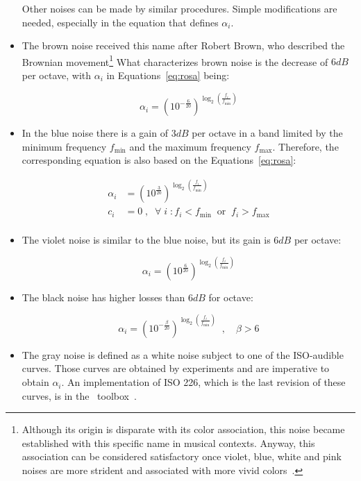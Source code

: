 \begin{itemize}
Other noises can be made by similar procedures. Simple modifications are needed, especially in the equation that defines $\alpha_i$.

  \item The brown noise received this name after Robert Brown, who described the Brownian movement\footnote{Although its origin is disparate with its color association, this noise became established with this specific name in musical contexts. Anyway, this association can be considered satisfactory once violet, blue, white and pink noises are more strident and associated with more vivid colors~\cite{Cook,guillaume}.} What characterizes brown noise is the decrease of $6dB$ per octave, with $\alpha_i$ in Equations~\ref{eq:rosa} being:

\begin{equation}\label{eq:marrom}
 \alpha_i=(10^{-\frac{6}{20}})^{\log _2 \left( \frac{f_i}{f_{\text{min}}} \right )}
\end{equation}

 \item In the blue noise there is a gain of $3dB$ per octave in a band limited by the minimum frequency $f_{\text{min}}$ and the maximum frequency $f_{\text{max}}$. Therefore, the corresponding equation is also based on the Equations~\ref{eq:rosa}:

\begin{equation}\label{eq:azul}
 \begin{split}
 \alpha_i & = (10^{\frac{3}{20}})^{\log _2 \left ( \frac{f_i}{f_{\text{min}}} \right )} \\
 c_i & =0\;,\;\; \forall \; i \; : f_i<f_{\text{min}} \;\; \text{or} \;\; f_i>f_{\text{max}} \\
 \end{split}
\end{equation}

 \item The violet noise is similar to the blue noise, but its gain is $6dB$ per octave:

\begin{equation}\label{eq:violeta}
 \alpha_i = (10^{\frac{6}{20}})^{\log _2 \left ( \frac{f_i}{f_{\text{min}}} \right )}
\end{equation}

 \item The black noise has higher losses than $6dB$ for octave:

\begin{equation}\label{eq:preto}
 \alpha_i=(10^{-\frac{\beta}{20}})^{\log _2 \left( \frac{f_i}{f_{\text{min}}} \right )}\;\;, \quad \beta > 6
\end{equation}

 \item The gray noise is defined as a white noise subject to one of the ISO-audible curves. Those curves are obtained by experiments and are imperative to obtain $\alpha_i$. An implementation of ISO 226, which is the last revision of these curves, is in the \massa\ toolbox~\cite{MASSA}.
\end{itemize}

